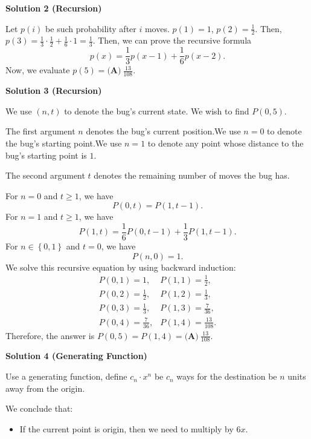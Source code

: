 \begin{enumerate}
\textbf{Solution 2 (Recursion)}

Let $p(i)$ be such probability after $i$ moves. $p(1)=1$, $p(2)=\frac{1}{2}$. Then, $p(3)=\frac{1}{3}\cdot \frac{1}{2}+\frac{1}{6}\cdot 1=\frac{1}{3}$. Then, we can prove the recursive formula 
 \[p(x)=\frac{1}{3}p(x-1)+\frac{1}{6}p(x-2).\] Now, we evaluate $p(5)=\boxed{\textbf{(A)}\ \frac{13}{108}}$.

 



\textbf{Solution 3 (Recursion)}

We use $(n,t)$ to denote the bug's current state. We wish to find $P(0,5)$.

 The first argument $n$ denotes the bug's current position.We use $n = 0$ to denote the bug's starting point.We use $n = 1$ to denote any point whose distance to the bug's starting point is $1$.

 The second argument $t$ denotes the remaining number of moves the bug has.

 For $n = 0$ and $t \geq 1$, we have 
 \[P(0,t) = P(1,t-1).\]For $n = 1$ and $t \geq 1$, we have 
 \[P(1,t) = \frac{1}{6} P(0,t-1) + \frac{1}{3} P(1,t-1).\]For $n \in \left\{ 0 , 1 \right\}$ and $t = 0$, we have 
 \[P(n,0) = 1.\]We solve this recursive equation by using backward induction:
 \[\begin{array}{ll} P(0,1) = 1, & P(1,1) = \frac{1}{2}, \\ [1ex] P(0,2) = \frac{1}{2}, & P(1,2) = \frac{1}{3}, \\ [1ex] P(0,3) = \frac{1}{3}, & P(1,3) = \frac{7}{36}, \\ [1ex] P(0,4) = \frac{7}{36}, & P(1,4) = \frac{13}{108}. \end{array}\]Therefore, the answer is $P(0,5) = P(1,4) = \boxed{\textbf{(A)}\ \frac{13}{108}}$.

 



\textbf{Solution 4 (Generating Function)}

Use a generating function, define $c_{n}\cdot x^{n}$ be $c_{n}$ ways for the destination be $n$ units away from the origin. 

 We conclude that:

 
            \begin{itemize}
        \item If the current point is origin, then we need to multiply by $6x$.
            \end{itemize}
            

\end{enumerate}
